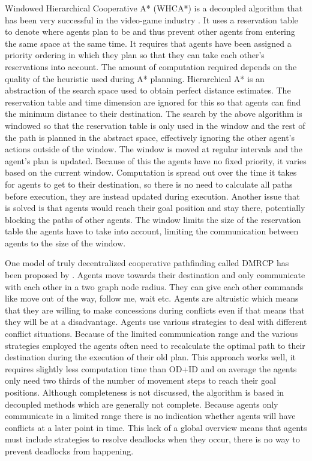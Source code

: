 Windowed Hierarchical Cooperative A* (WHCA*) is a decoupled algorithm that has
been very successful in the video-game industry \cite{silver2005}. It uses a
reservation table to denote where agents plan to be and thus prevent other
agents from entering the same space at the same time. It requires that agents
have been assigned a priority ordering in which they plan so that they can take
each other's reservations into account. The amount of computation required
depends on the quality of the heuristic used during A* planning. Hierarchical
A* is an abstraction of the search space used to obtain perfect distance
estimates. The reservation table and time dimension are ignored for this so
that agents can find the minimum distance to their destination. The search by
the above algorithm is windowed so that the reservation table is only used in
the window and the rest of the path is planned in the abstract space,
effectively ignoring the other agent's actions outside of the window. The
window is moved at regular intervals and the agent's plan is updated. Because
of this the agents have no fixed priority, it varies based on the current
window. Computation is spread out over the time it takes for agents to get to
their destination, so there is no need to calculate all paths before execution,
they are instead updated during execution. Another issue that is solved is that
agents would reach their goal position and stay there, potentially blocking the
paths of other agents. The window limits the size of the reservation table the
agents have to take into account, limiting the
communication between agents to the size of the window.

One model of truly decentralized cooperative pathfinding called DMRCP has been
proposed by
\cite{wei2016}. Agents move towards their destination and only communicate with
each other in a two graph node radius. They can give each other commands like
move out of the way, follow me, wait etc. Agents are altruistic which means
that they are willing to make concessions during conflicts even if that means
that they will be at a disadvantage. Agents use various strategies to deal with
different conflict situations. Because of the limited communication range and
the various strategies employed the agents often need to recalculate the
optimal path to their destination during the execution of their old plan. This
approach works well, it requires slightly less computation time than OD+ID and
on average the agents only need two thirds of the number of movement steps to
reach their goal positions. Although completeness is not discussed, the
algorithm is based in decoupled methods which are generally not complete.
Because agents only communicate in a limited range there is no indication
whether agents will have conflicts at a later point in time. This lack of a
global overview means that agents must include strategies to resolve deadlocks
when they occur, there is no way to prevent deadlocks from happening.

